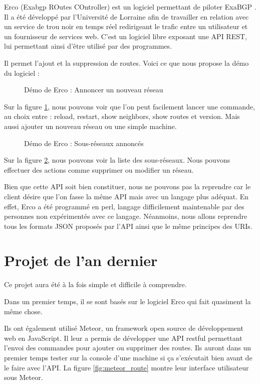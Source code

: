 Erco (Exabgp ROutes COntroller) est un logiciel permettant de piloter ExaBGP \cite{Did15}. Il a été développé par l'Université de Lorraine afin de travailler en relation avec un service de trou noir en temps réel redirigeant le trafic entre un utilisateur et un fournisseur de services web. C'est un logiciel libre exposant une API REST, lui permettant ainsi d'être utilisé par des programmes.

Il permet l'ajout et la suppression de routes. Voici ce que nous propose la démo du logiciel \cite{Erc16} :

\begin{figure}[H]
\caption{Démo de Erco : Annoncer un nouveau réseau}
\label{fig:erco_demo_announce}
\end{figure}

Sur la figure \ref{fig:erco_demo_announce}, nous pouvons voir que l'on peut facilement lancer une commande, au choix entre : reload, restart, show neighbors, show routes et version. Mais aussi ajouter un nouveau réseau ou une simple machine.

\begin{figure}[H]
\caption{Démo de Erco : Sous-réseaux annoncés}
\label{fig:erco_announced}
\end{figure}

Sur la figure \ref{fig:erco_announced}, nous pouvons voir la liste des sous-réseaux. Nous pouvons effectuer des actions comme supprimer ou modifier un réseau.

Bien que cette API soit bien constituer, nous ne pouvons pas la reprendre car le client désire que l'on fasse la même API mais avec un langage plus adéquat. En effet, Erco a été programmé en perl, langage difficilement maintenable par des personnes non expérimentés avec ce langage. Néanmoins, nous allons reprendre tous les formats JSON proposés par l'API ainsi que le même principes des URIs.

\section{Projet de l'an dernier}
Ce projet aura été à la fois simple et difficile à comprendre.

Dans un premier temps, il se sont basés sur le logiciel Erco qui fait quasiment la même chose.

Ils ont également utilisé Meteor, un framework open source de développement web en JavaScript.
Il leur a permis de développer une API restful permettant l'envoi des commandes pour ajouter ou supprimer des routes. Ils auront dans un premier temps tester sur la console d'une machine si ça s'exécutait bien avant de le faire avec l'API. La figure \ref{fig:meteor_route} montre leur interface utilisateur sous Meteor.

